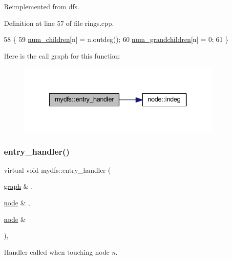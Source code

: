 Reimplemented from \mbox{\hyperlink{classdfs_a6473b0a5d792d9e45c3d32dfdc5b5ffc}{dfs}}.



Definition at line 57 of file rings.\+cpp.


\begin{DoxyCode}
58     \{
59         \mbox{\hyperlink{rings_8cpp_a021486f59a5a82e4020e5f4ce19b57a9}{num\_children}}[n] = n.outdeg();
60         \mbox{\hyperlink{rings_8cpp_ae20dca00c1e05052649489eb4ffe212f}{num\_grandchildren}}[n] = 0;
61     \}
\end{DoxyCode}
Here is the call graph for this function\+:
\nopagebreak
\begin{figure}[H]
\begin{center}
\leavevmode
\includegraphics[width=290pt]{classmydfs_af8bf3716d6d01426821692c1bca8970c_cgraph}
\end{center}
\end{figure}
\mbox{\label{classmydfs_af8bf3716d6d01426821692c1bca8970c}} 
\subsubsection{\texorpdfstring{entry\+\_\+handler()}{entry\_handler()}\hspace{0.1cm}{\footnotesize\ttfamily [2/2]}}
{\footnotesize\ttfamily virtual void mydfs\+::entry\+\_\+handler (\begin{DoxyParamCaption}\item[{\mbox{\hyperlink{classgraph}{graph}} \&}]{,  }\item[{\mbox{\hyperlink{classnode}{node}} \&}]{,  }\item[{\mbox{\hyperlink{classnode}{node}} \&}]{ }\end{DoxyParamCaption})\hspace{0.3cm}{\ttfamily [inline]}, {\ttfamily [virtual]}}



Handler called when touching node {\itshape n}. 


